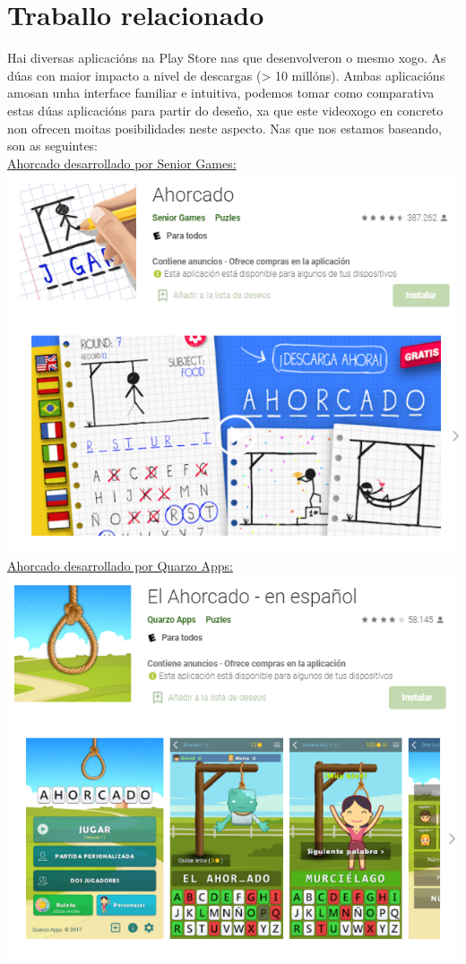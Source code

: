 \section{Traballo relacionado}
Hai diversas aplicacións na Play Store nas que desenvolveron o mesmo xogo.
As dúas con maior impacto a nivel de descargas (> 10 millóns). Ambas aplicacións amosan unha interface familiar e intuitiva, podemos tomar como comparativa estas dúas aplicacións para partir do deseño, xa que este videoxogo en concreto non ofrecen moitas posibilidades neste aspecto. Nas que nos estamos baseando, son as seguintes:\\[100 pt]
\href{https://play.google.com/store/apps/details?id=com.tellmewow.senior.hangman&hl=es&gl=US}{Ahorcado desarrollado por Senior Games:}\\
\includegraphics[scale=0.65]{imaxes/app1.png}\\[12 pt]

\href{https://play.google.com/store/apps/details?id=com.quarzo.hangmanwords&hl=es&gl=US}{Ahorcado desarrollado por Quarzo Apps:}\\
\includegraphics[scale=0.65]{imaxes/app2.png}\\[12 pt]
 \let\cleardoublepage=\clearpage 

